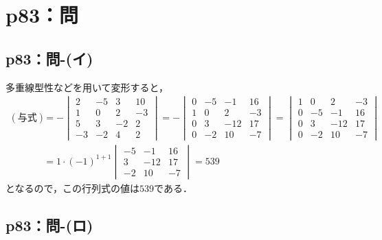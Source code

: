 \documentclass[a4paper,10pt,fleqn]{ltjsarticle}
\begin{document}
\newpage

\section*{p83：問}

\subsection*{p83：問-(イ)}

\begin{tleftbar}
    多重線型性などを用いて変形すると，
    \begin{align*}
        (\text{与式}) & = -
        \begin{vmatrix}
            2  & -5 & 3  & 10 \\
            1  & 0  & 2  & -3 \\
            5  & 3  & -2 & 2  \\
            -3 & -2 & 4  & 2
        \end{vmatrix}
        = -
        \begin{vmatrix}
            0 & -5 & -1  & 16 \\
            1 & 0  & 2   & -3 \\
            0 & 3  & -12 & 17 \\
            0 & -2 & 10  & -7
        \end{vmatrix}
        =
        \begin{vmatrix}
            1 & 0  & 2   & -3 \\
            0 & -5 & -1  & 16 \\
            0 & 3  & -12 & 17 \\
            0 & -2 & 10  & -7
        \end{vmatrix}                  \\
                    & = 1 \cdot (-1)^{1+1}
        \begin{vmatrix}
            -5 & -1  & 16 \\
            3  & -12 & 17 \\
            -2 & 10  & -7
        \end{vmatrix}
        =539
    \end{align*}
    となるので，この行列式の値は$539$である．
\end{tleftbar}


\subsection*{p83：問-(ロ)}
\end{document}
